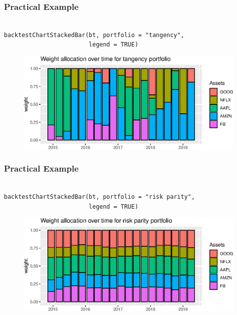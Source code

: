 \documentclass{beamer}
\begin{document}
\begin{frame}[fragile]
  \frametitle{Practical Example}
\begin{verbatim}

backtestChartStackedBar(bt, portfolio = "tangency",
                        legend = TRUE)
\end{verbatim}
\begin{figure}[!htb]
  \centering
  \includegraphics[scale=.7]{codes/weights-msr.eps}
\end{figure}
\end{frame}


\begin{frame}[fragile]
  \frametitle{Practical Example}
\begin{verbatim}

backtestChartStackedBar(bt, portfolio = "risk parity",
                        legend = TRUE)
\end{verbatim}
\begin{figure}[!htb]
  \centering
  \includegraphics[scale=.7]{codes/weights-rpp.eps}
\end{figure}
\end{frame}
\end{document}
